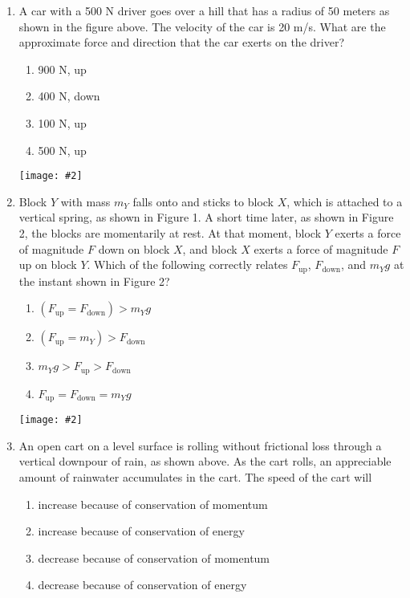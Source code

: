\documentclass[11pt]{article}
\newcommand{\pic}[2]{\texttt{[image: \#2]}}
\begin{document}
\begin{multicols}{2}
\begin{enumerate}[leftmargin=18pt]
    \begin{center}
      \pic{.45}{IMG_20200810_093039201}
    \end{center}
  \item A car with a 500 N driver goes over a hill that has a radius of 50
    meters as shown in the figure above. The velocity of the car is 20 m/s.
    What are the approximate force and direction that the car exerts on the
    driver?
    \begin{enumerate}[nosep,leftmargin=18pt,label=(\Alph*)]
    \item 900 N, up
    \item 400 N, down
    \item 100 N, up
    \item 500 N, up
    \end{enumerate}
    \columnbreak
    
    \begin{center}
      \pic{.3}{falling-blocks}
    \end{center}
  \item Block $Y$ with mass $m_Y$ falls onto and sticks to block $X$, which is
    attached to a vertical spring, as shown in Figure 1. A short time later, as
    shown in Figure 2, the blocks are momentarily at rest. At that moment,
    block $Y$ exerts a force of magnitude $F$ down on block $X$, and block $X$
    exerts a force of magnitude $F$ up on block $Y$. Which of the following
    correctly relates $F_\text{up}$, $F_\text{down}$, and $m_Yg$ at the
    instant shown in Figure 2?
    \begin{enumerate}[nosep,leftmargin=18pt,label=(\Alph*)]
    \item$\left(F_\mathrm{up}=F_\mathrm{down}\right)>m_Yg$
    \item$\left(F_\mathrm{up}=m_Y\right)>F_\mathrm{down}$
    \item$m_Yg > F_\mathrm{up} > F_\mathrm{down}$
    \item$F_\mathrm{up}=F_\mathrm{down}=m_Yg$
    \end{enumerate}
    \vspace{.7in}
    
    \begin{center}
      \pic{.4}{downpour}
    \end{center}
  \item An open cart on a level surface is rolling without frictional loss
    through a vertical downpour of rain, as shown above. As the cart rolls,
    an appreciable amount of rainwater accumulates in the cart. The speed of
    the cart will
    \begin{enumerate}[nosep,leftmargin=18pt,label=(\Alph*)]
    \item increase because of conservation of momentum
    \item increase because of conservation of energy
    \item decrease because of conservation of momentum
    \item decrease because of conservation of energy
    \end{enumerate}
    \columnbreak


\end{enumerate}
\end{multicols}
\end{document}

